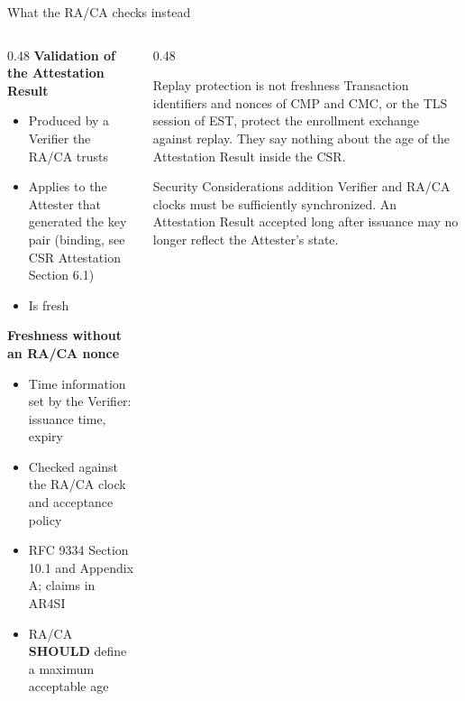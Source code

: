 \documentclass[aspectratio=169,10pt]{beamer}
\begin{document}
\begin{frame}{What the RA/CA checks instead}
  \small
  \begin{columns}[T,onlytextwidth]
    \begin{column}{0.48\textwidth}
      \textbf{Validation of the Attestation Result}
      \begin{itemize}
        \item Produced by a Verifier the RA/CA trusts
        \item Applies to the Attester that generated the key pair
              (binding, see CSR Attestation Section 6.1)
        \item Is fresh
      \end{itemize}
      \vspace{0.15cm}
      \textbf{Freshness without an RA/CA nonce}
      \begin{itemize}
        \item Time information set by the Verifier: issuance time, expiry
        \item Checked against the RA/CA clock and acceptance policy
        \item RFC 9334 Section 10.1 and Appendix A; claims in AR4SI
        \item RA/CA \textbf{SHOULD} define a maximum acceptable age
      \end{itemize}
    \end{column}
    \begin{column}{0.48\textwidth}
      \begin{block}{Replay protection is not freshness}
        Transaction identifiers and nonces of CMP and CMC, or the TLS session
        of EST, protect the enrollment exchange against replay. They say
        nothing about the age of the Attestation Result inside the CSR.
      \end{block}
      \vspace{0.2cm}
      \begin{block}{Security Considerations addition}
        Verifier and RA/CA clocks must be sufficiently synchronized.
        An Attestation Result accepted long after issuance may no longer
        reflect the Attester's state.
      \end{block}
    \end{column}
  \end{columns}
\end{frame}
\end{document}
